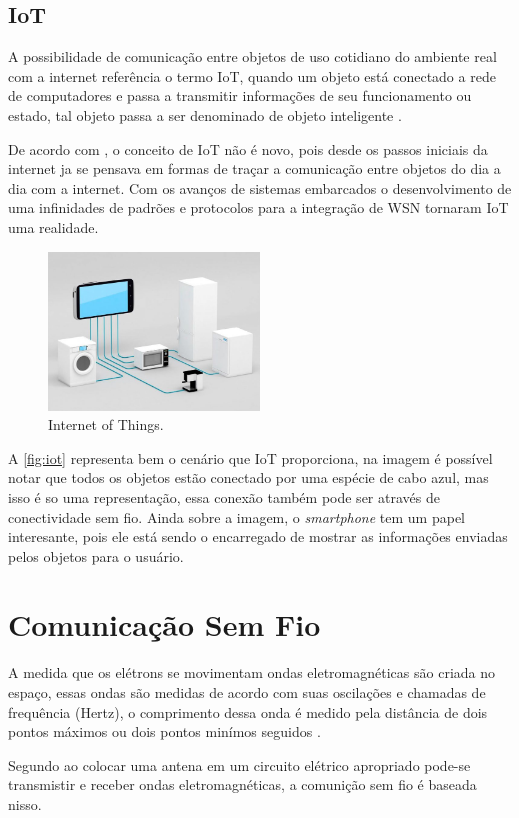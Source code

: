     

    \subsection{IoT}
    \par
    A possibilidade de comunicação entre objetos de uso cotidiano do ambiente real com a internet referência o termo IoT, quando um objeto está conectado a rede de computadores e passa a transmitir informações de seu funcionamento ou estado, tal objeto passa a ser denominado de objeto inteligente \cite{iot2016}.
    \par
    De acordo com \citeauthor{iot2017}, o conceito de IoT não é novo, pois desde os passos iniciais da internet ja se pensava em formas de traçar a comunicação entre objetos do dia a dia com a internet. Com os avanços de sistemas embarcados o desenvolvimento de uma infinidades de padrões e protocolos para a integração de WSN tornaram IoT uma realidade.
    \begin{figure}[H]
              \caption{\label{fig:iot}{Internet of Things.}}
              \centering
              \includegraphics[width=0.5\textwidth]{Figuras/iot.png}
        \end{figure}
    \par
    A \autoref{fig:iot} representa bem o cenário que IoT proporciona, na imagem é possível notar que todos os objetos estão conectado por uma espécie de cabo azul, mas isso é so uma representação, essa conexão também pode ser através de conectividade sem fio. Ainda sobre a imagem, o \textit{smartphone} tem um papel interesante, pois ele está sendo o encarregado de mostrar as informações enviadas pelos objetos para o usuário.
    
\section{Comunicação Sem Fio}
    \par
    A medida que os elétrons se movimentam ondas eletromagnéticas são criada no espaço, essas ondas são medidas de acordo com suas oscilações e chamadas de frequência (Hertz), o comprimento dessa onda é medido pela distância de dois pontos máximos ou dois pontos minímos seguidos \cite{tenenbaum2002}.
    \par
    Segundo \citeauthor{tenenbaum2002} ao colocar uma antena em um circuito elétrico apropriado pode-se  transmistir e receber ondas eletromagnéticas, a comunição sem fio é baseada nisso.
    
